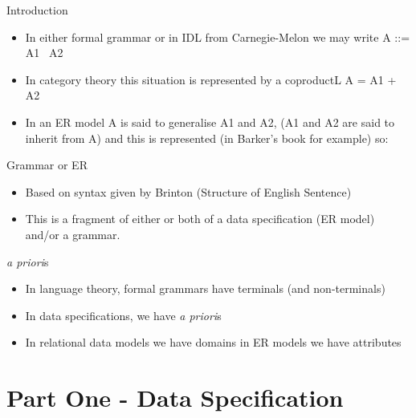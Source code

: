 \documentclass{beamer}
\renewcommand{\erpictureFolder}[0]{../SharedPictures}
\begin{document}
\begin{frame}{Introduction}
\begin{itemize}
\pause \item In either formal grammar or in IDL from Carnegie-Melon we may write A ::= A1 \textbar\  A2
\pause \item In category theory this situation is represented by a coproductL A = A1 + A2  
\pause \item In an ER model  A is said to generalise A1 and A2, (A1 and A2 are said to inherit from A) and this is represented
(in Barker's book for example) so:
\end{itemize}
\begin{center}
\scalebox{0.85}{

}
\end{center}
\end{frame}
\begin{frame}{Grammar or ER}
\begin{itemize}
\pause \item Based on syntax given by Brinton (Structure of English Sentence)
\end{itemize}
\begin{center}
\scalebox{0.85}{

}
\end{center}
\begin{itemize}
\pause \item This is a fragment of either or both of a data specification (ER model) and/or a grammar.
\end{itemize}
\end{frame}

\begin{frame}{\textit{a priori}s}
\begin{itemize}
\item In language theory, formal grammars have terminals (and non-terminals)
\pause \item In data specifications, we have \textit{a priori}s
\pause \item In relational data models we have domains
\pause in ER models we have attributes 

\end{itemize}

\end{frame}

\section{Part One - Data Specification}
\end{document}
